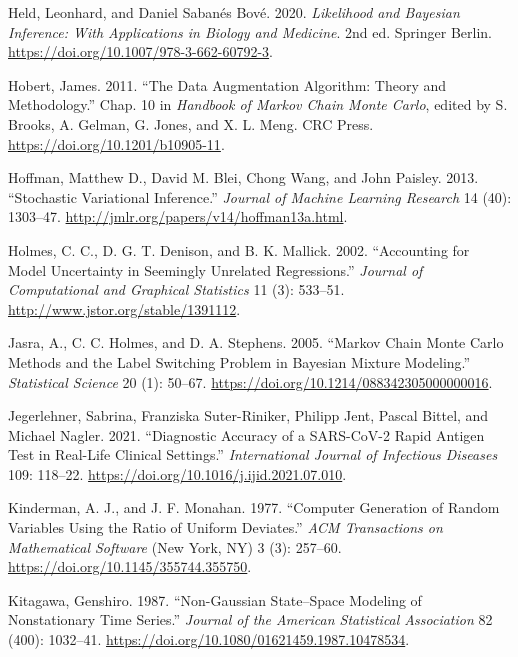 \documentclass[
  11pt,
  letterpaper,
]{scrbook}
\newlength{\cslhangindent}
\newenvironment{CSLReferences}[2] %
 {\begin{list}{}{%
  \setlength{\itemindent}{0pt}
  \setlength{\leftmargin}{0pt}
  \setlength{\parsep}{0pt}
  \ifodd #1
   \setlength{\leftmargin}{\cslhangindent}
   \setlength{\itemindent}{-1\cslhangindent}
  \fi
  \setlength{\itemsep}{#2\baselineskip}}}
 {\end{list}}
\theoremstyle{definition}
\theoremstyle{plain}
\theoremstyle{plain}
\theoremstyle{plain}
\theoremstyle{definition}
\theoremstyle{definition}
\theoremstyle{plain}
\theoremstyle{plain}
\theoremstyle{remark}
\begin{document}
\begin{CSLReferences}{1}{1}
Held, Leonhard, and Daniel Sabanés Bové. 2020. \emph{Likelihood and
{B}ayesian Inference: With Applications in Biology and Medicine}. 2nd
ed. Springer Berlin. \url{https://doi.org/10.1007/978-3-662-60792-3}.

Hobert, James. 2011. {``The Data Augmentation Algorithm: Theory and
Methodology.''} Chap. 10 in \emph{Handbook of {M}arkov Chain {M}onte
{C}arlo}, edited by S. Brooks, A. Gelman, G. Jones, and X. L. Meng. CRC
Press. \url{https://doi.org/10.1201/b10905-11}.

Hoffman, Matthew D., David M. Blei, Chong Wang, and John Paisley. 2013.
{``Stochastic Variational Inference.''} \emph{Journal of Machine
Learning Research} 14 (40): 1303--47.
\url{http://jmlr.org/papers/v14/hoffman13a.html}.

Holmes, C. C., D. G. T. Denison, and B. K. Mallick. 2002. {``Accounting
for Model Uncertainty in Seemingly Unrelated Regressions.''}
\emph{Journal of Computational and Graphical Statistics} 11 (3):
533--51. \url{http://www.jstor.org/stable/1391112}.

Jasra, A., C. C. Holmes, and D. A. Stephens. 2005. {``{M}arkov Chain
{M}onte {C}arlo Methods and the Label Switching Problem in {B}ayesian
Mixture Modeling.''} \emph{Statistical Science} 20 (1): 50--67.
\url{https://doi.org/10.1214/088342305000000016}.

Jegerlehner, Sabrina, Franziska Suter-Riniker, Philipp Jent, Pascal
Bittel, and Michael Nagler. 2021. {``Diagnostic Accuracy of a
{SARS-CoV-2} Rapid Antigen Test in Real-Life Clinical Settings.''}
\emph{International Journal of Infectious Diseases} 109: 118--22.
\url{https://doi.org/10.1016/j.ijid.2021.07.010}.

Kinderman, A. J., and J. F. Monahan. 1977. {``Computer Generation of
Random Variables Using the Ratio of Uniform Deviates.''} \emph{ACM
Transactions on Mathematical Software} (New York, NY) 3 (3): 257--60.
\url{https://doi.org/10.1145/355744.355750}.

Kitagawa, Genshiro. 1987. {``Non-{G}aussian State--Space Modeling of
Nonstationary Time Series.''} \emph{Journal of the American Statistical
Association} 82 (400): 1032--41.
\url{https://doi.org/10.1080/01621459.1987.10478534}.


\end{CSLReferences}
\end{document}
